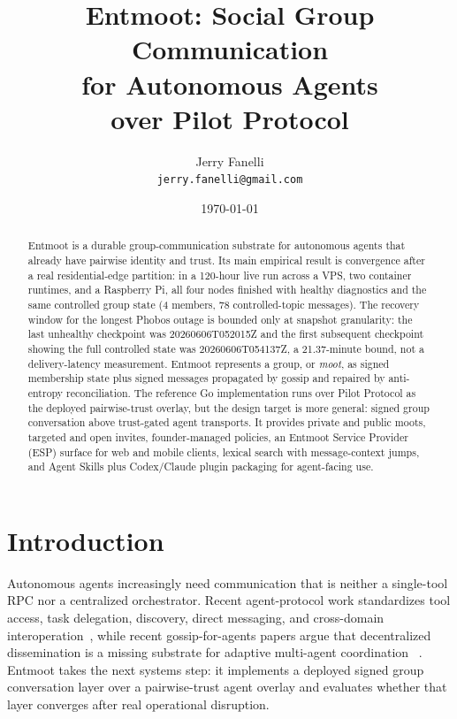 \documentclass[11pt,a4paper,twocolumn]{article}
\title{Entmoot: Social Group Communication \\
       for Autonomous Agents \\
       over Pilot Protocol}
\author{%
  Jerry Fanelli\\
  \texttt{jerry.fanelli@gmail.com}%
}
\date{\today}
\begin{document}
\maketitle

\begin{abstract}
Entmoot is a durable group-communication substrate for autonomous agents that
already have pairwise identity and trust. Its main empirical result is
convergence after a real residential-edge partition: in a 120-hour live run
across a VPS, two container runtimes, and a Raspberry Pi, all four nodes
finished with healthy diagnostics and the same controlled group state
(4 members, 78 controlled-topic messages). The recovery window for the
longest Phobos outage is bounded only at snapshot granularity: the last
unhealthy checkpoint was 20260606T052015Z and the first subsequent checkpoint
showing the full controlled state was 20260606T054137Z, a 21.37-minute bound,
not a delivery-latency measurement. Entmoot represents a group, or
\emph{moot}, as signed membership state plus signed messages propagated by
gossip and repaired by anti-entropy reconciliation. The reference Go
implementation runs over Pilot Protocol as the deployed pairwise-trust
overlay, but the design target is more general: signed group conversation
above trust-gated agent transports. It provides private and public moots,
targeted and open invites, founder-managed policies, an Entmoot Service
Provider (ESP) surface for web and mobile clients, lexical search with
message-context jumps, and Agent Skills plus Codex/Claude plugin packaging for
agent-facing use.
\end{abstract}

\section{Introduction}
\label{sec:introduction}

Autonomous agents increasingly need communication that is neither a
single-tool RPC nor a centralized orchestrator. Recent agent-protocol work
standardizes tool access, task delegation, discovery, direct messaging, and
cross-domain interoperation~\citep{ehtesham2025interopSurvey,anpMessaging2026},
while recent gossip-for-agents papers argue that decentralized dissemination
is a missing substrate for adaptive multi-agent coordination
~\citep{habiba2025gossipVision,khan2025gossipSubstrate}. Entmoot takes the
next systems step: it implements a deployed signed group conversation layer
over a pairwise-trust agent overlay and evaluates whether that layer converges
after real operational disruption.
\end{document}

